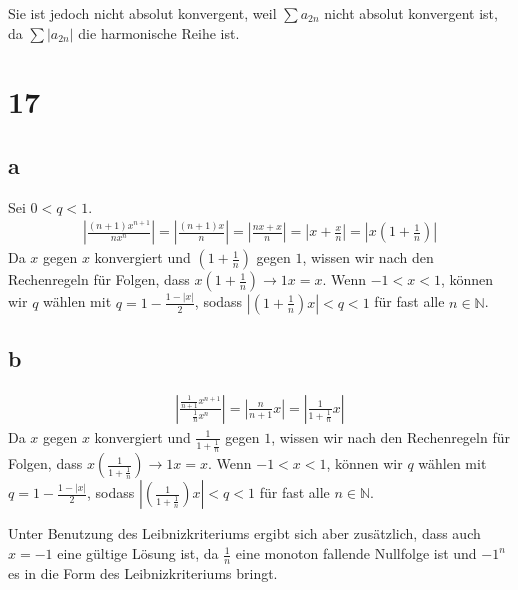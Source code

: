\documentclass[a4paper,10pt]{article}
\begin{document}
Sie ist jedoch nicht absolut konvergent, weil $\sum a_{2n}$ nicht absolut konvergent ist, da $\sum |a_{2n}|$ die harmonische Reihe ist. 

\section*{17}

\subsection*{a}

Sei $0 < q < 1$.
\begin{align}
 |\frac{(n + 1)x^{n + 1}}{nx^n}| = |\frac{(n + 1)x}{n}| = |\frac{nx + x}{n}| = |x + \frac{x}{n}| = |x(1 + \frac{1}{n})|
\end{align}
Da $x$ gegen $x$ konvergiert und $(1 + \frac{1}{n})$ gegen $1$, wissen wir nach den Rechenregeln für Folgen, dass $x(1 + \frac{1}{n}) \rightarrow 1x = x$.
Wenn $-1 < x < 1$, können wir $q$ wählen mit $q = 1 - \frac{1 - |x|}{2}$, sodass $|(1 + \frac{1}{n})x| < q < 1$ für fast alle $n \in \mathbb{N}$.

\subsection*{b}

\begin{align}
 |\frac{\frac{1}{n + 1}x^{n + 1}}{\frac{1}{n}x^n}| = |\frac{n}{n + 1}x| = |\frac{1}{1 + \frac{1}{n}}x|
\end{align}
Da $x$ gegen $x$ konvergiert und $\frac{1}{1 + \frac{1}{n}}$ gegen $1$, wissen wir nach den Rechenregeln für Folgen, dass $x(\frac{1}{1 + \frac{1}{n}}) \rightarrow 1x = x$.
Wenn $-1 < x < 1$, können wir $q$ wählen mit $q = 1 - \frac{1 - |x|}{2}$, sodass $|(\frac{1}{1 + \frac{1}{n}})x| < q < 1$ für fast alle $n \in \mathbb{N}$.

Unter Benutzung des Leibnizkriteriums ergibt sich aber zusätzlich, dass auch $x = -1$ eine gültige Lösung ist, da $\frac{1}{n}$ eine monoton fallende Nullfolge ist und $-1^n$ es in die Form des Leibnizkriteriums bringt.
\end{document}

